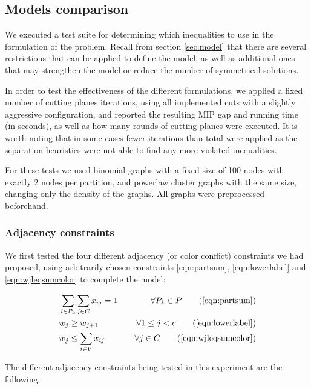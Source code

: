 
\subsection{Models comparison}

We executed a test suite for determining which inequalities to use in the formulation of the problem. Recall from section \ref{sec:model} that there are several restrictions that can be applied to define the model, as well as additional ones that may strengthen the model or reduce the number of symmetrical solutions.

In order to test the effectiveness of the different formulations, we applied a fixed number of cutting planes iterations, using all implemented cuts with a slightly aggressive configuration, and reported the resulting MIP gap and running time (in seconds), as well as how many rounds of cutting planes were executed. It is worth noting that in some cases fewer iterations than total were applied as the separation heuristics were not able to find any more violated inequalities.

For these tests we used binomial graphs with a fixed size of 100 nodes with exactly 2 nodes per partition, and powerlaw cluster graphs with the same size, changing only the density of the graphs. All graphs were preprocessed beforehand.

\subsubsection{Adjacency constraints}

We first tested the four different adjacency (or color conflict) constraints we had proposed, using arbitrarily chosen constraints \ref{eqn:partsum}, \ref{eqn:lowerlabel} and \ref{eqn:wjleqsumcolor} to complete the model:

\begin{align*}
&\sum_{i \in P_k} \sum_{j \in C} x_{ij} = 1 &\quad \forall P_k \in P \tag{\ref{eqn:partsum}} \\
&w_j \geq w_{j+1} &\quad \forall 1 \leq j < c \tag{\ref{eqn:lowerlabel}} \\
&w_j \leq \sum_{i \in V} x_{ij} &\quad \forall j \in C \tag{\ref{eqn:wjleqsumcolor}} \\
\end{align*}

The different adjacency constraints being tested in this experiment are the following: 

